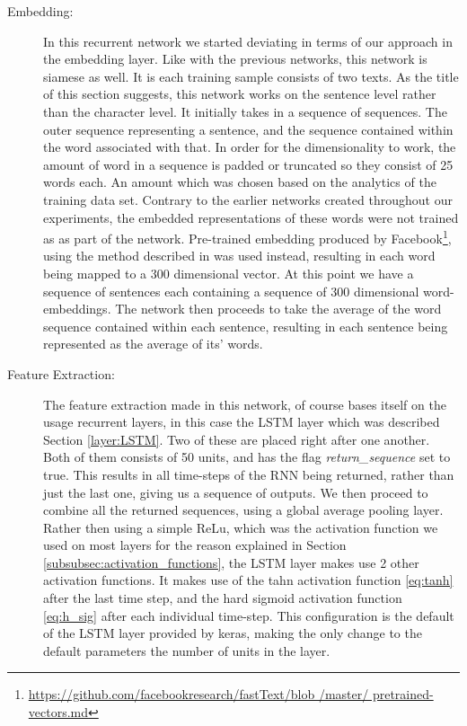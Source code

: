 \begin{description}
\item[Embedding:]

        In this recurrent network we started deviating in terms of our approach
        in the embedding layer. Like with the previous networks, this network
        is siamese as well. It is each training sample consists of two texts.
        As the title of this section suggests, this network works on the
        sentence level rather than the character level. It initially takes in
        a sequence of sequences. The outer sequence representing a sentence,
        and the sequence contained within the word associated with that.
        In order for the dimensionality to work, the amount of word in a
        sequence is padded or truncated so they consist of 25 words each.
        An amount which was chosen based on the analytics of the training
        data set. Contrary to the earlier networks created throughout our
        experiments, the embedded representations of these words were not
        trained as as part of the network. Pre-trained embedding produced by
        Facebook\footnote{\url{https://github.com/facebookresearch/fastText/blob
        /master/ pretrained-vectors.md}}, using the method described in
        \citet{bojanowski2016enriching} was used instead, resulting in each
        word being mapped to a 300 dimensional vector. At this point we have
        a sequence of sentences each containing a sequence of 300 dimensional
        word-embeddings. The network then proceeds to take the average of the
        word sequence contained within each sentence, resulting in each sentence
        being represented as the average of its' words.

    \item[Feature Extraction:]

        The feature extraction made in this network, of course bases itself
        on the usage recurrent layers, in this case the \gls{LSTM} layer
        which was described Section \ref{layer:LSTM}. Two of these are placed
        right after one another. Both of them consists of 50 units, and has
        the flag \textit{return\_sequence} set to true. This results in
        all time-steps of the \gls{RNN} being returned, rather than just
        the last one, giving us a sequence of outputs. We then proceed to
        combine all the returned sequences, using a global average pooling
        layer. Rather then using a simple ReLu, which was the activation
        function we used on most layers for the reason explained in Section
        \ref{subsubsec:activation_functions}, the LSTM layer makes use 2
        other activation functions. It makes use of the tahn activation
        function \eqref{eq:tanh} after the last time step, and the hard sigmoid
        activation function \eqref{eq:h_sig} after each individual time-step.
        This configuration is the default of the LSTM layer provided by keras,
        making the only change to the default parameters the number of units in
        the layer.


\end{description}
